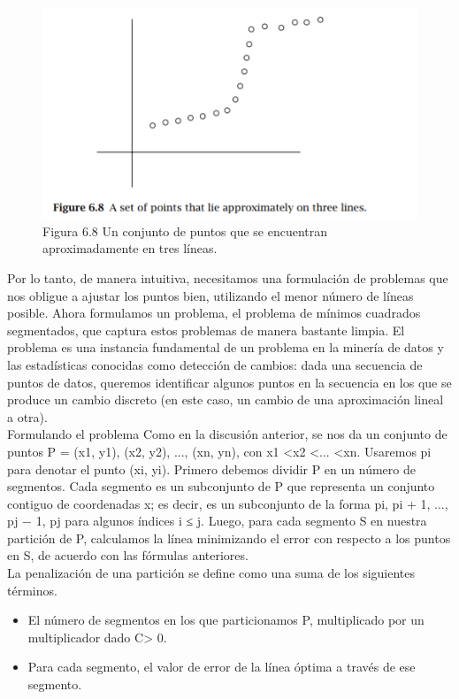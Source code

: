 \documentclass[a4paper, 12pt]{book}
\theoremstyle{dotless}
\begin{document}
\begin{figure}[h]
\centering
\includegraphics[scale=1]{Imagenes-Seccion6/fig6_8.PNG}
\caption{Figura 6.8 Un conjunto de puntos que se encuentran aproximadamente en tres líneas.}
\end{figure}

Por lo tanto, de manera intuitiva, necesitamos una formulación de problemas que nos obligue a ajustar los puntos bien, utilizando el menor número de líneas posible. Ahora formulamos un problema, el problema de mínimos cuadrados segmentados, que captura estos problemas de manera bastante limpia. El problema es una instancia fundamental de un problema en la minería de datos y las estadísticas conocidas como detección de cambios: dada una secuencia de puntos de datos, queremos identificar algunos puntos en la secuencia en los que se produce un cambio discreto (en este caso, un cambio de una aproximación lineal a otra).\\

Formulando el problema Como en la discusión anterior, se nos da un conjunto de puntos P = {(x1, y1), (x2, y2), ..., (xn, yn)}, con x1 <x2 <... <xn. Usaremos pi para denotar el punto (xi, yi). Primero debemos dividir P en un número de segmentos. Cada segmento es un subconjunto de P que representa un conjunto contiguo de coordenadas x; es decir, es un subconjunto de la forma {pi, pi + 1, ..., pj − 1, pj} para algunos índices i ≤ j. Luego, para cada segmento S en nuestra partición de P, calculamos la línea minimizando el error con respecto a los puntos en S, de acuerdo con las fórmulas anteriores.\\

La penalización de una partición se define como una suma de los siguientes términos.\\

\begin{itemize}
    \item El número de segmentos en los que particionamos P, multiplicado por un multiplicador dado C> 0.
    \item Para cada segmento, el valor de error de la línea óptima a través de ese segmento.
\end{itemize}
\end{document}
